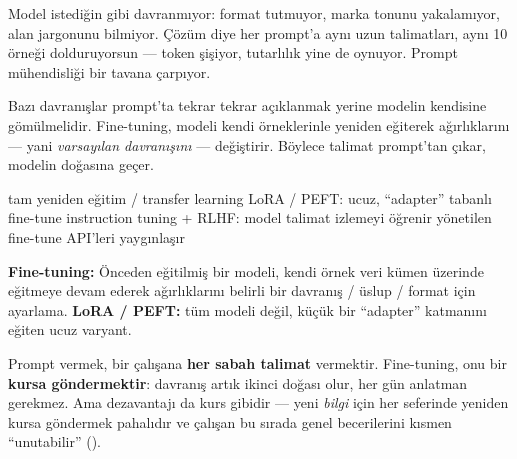 

Model istediğin gibi davranmıyor: format tutmuyor, marka tonunu yakalamıyor,
alan jargonunu bilmiyor. Çözüm diye her prompt'a aynı uzun talimatları, aynı 10
örneği dolduruyorsun --- token şişiyor, tutarlılık yine de oynuyor. Prompt
mühendisliği bir tavana çarpıyor.


Bazı davranışlar prompt'ta tekrar tekrar açıklanmak yerine modelin kendisine
gömülmelidir. Fine-tuning, modeli kendi örneklerinle yeniden eğiterek
ağırlıklarını --- yani \emph{varsayılan davranışını} --- değiştirir. Böylece
talimat prompt'tan çıkar, modelin doğasına geçer.

\begin{timeline}
 tam yeniden eğitim / transfer learning \tlsep {} LoRA / PEFT: ucuz, ``adapter'' tabanlı fine-tune \tlsep {} instruction tuning + RLHF: model talimat izlemeyi öğrenir \tlsep {} yönetilen fine-tune API'leri yaygınlaşır
\end{timeline}

\begin{problembox}
\textbf{Fine-tuning:} Önceden eğitilmiş bir modeli, kendi örnek veri kümen
üzerinde eğitmeye devam ederek ağırlıklarını belirli bir davranış / üslup /
format için ayarlama. \textbf{LoRA / PEFT:} tüm modeli değil, küçük bir
``adapter'' katmanını eğiten ucuz varyant.
\end{problembox}

\begin{mentalbox}
Prompt vermek, bir çalışana \textbf{her sabah talimat} vermektir. Fine-tuning,
onu bir \textbf{kursa göndermektir}: davranış artık ikinci doğası olur, her gün
anlatman gerekmez. Ama dezavantajı da kurs gibidir --- yeni \emph{bilgi} için
her seferinde yeniden kursa göndermek pahalıdır ve çalışan bu sırada genel
becerilerini kısmen ``unutabilir'' ().
\end{mentalbox}

